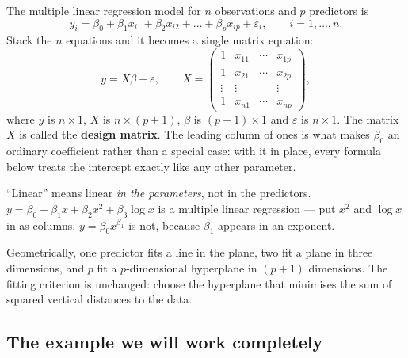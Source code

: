 \documentclass[11pt]{article}
\begin{document}
The multiple linear regression model for $n$ observations and $p$ predictors
is
\begin{equation}
  \label{eq:model}
  y_i = \beta_0 + \beta_1 x_{i1} + \beta_2 x_{i2} + \dots +
        \beta_p x_{ip} + \varepsilon_i,
  \qquad i = 1, \dots, n .
\end{equation}
Stack the $n$ equations and it becomes a single matrix equation:
\begin{equation}
  \label{eq:matrix}
  y = X\beta + \varepsilon,
  \qquad
  X = \begin{pmatrix}
    1 & x_{11} & \cdots & x_{1p}\\
    1 & x_{21} & \cdots & x_{2p}\\
    \vdots & \vdots & & \vdots\\
    1 & x_{n1} & \cdots & x_{np}
  \end{pmatrix},
\end{equation}
where $y$ is $n\times1$, $X$ is $n\times(p+1)$, $\beta$ is $(p+1)\times1$ and
$\varepsilon$ is $n\times1$. The matrix $X$ is called the \textbf{design
matrix}. The leading column of ones is what makes $\beta_0$ an ordinary
coefficient rather than a special case: with it in place, every formula below
treats the intercept exactly like any other parameter.

\begin{keyidea}
``Linear'' means linear \emph{in the parameters}, not in the predictors.
$y = \beta_0 + \beta_1 x + \beta_2 x^2 + \beta_3 \log x$ is a multiple linear
regression --- put $x^2$ and $\log x$ in as columns. $y = \beta_0 x^{\beta_1}$
is not, because $\beta_1$ appears in an exponent.
\end{keyidea}

Geometrically, one predictor fits a line in the plane, two fit a plane in
three dimensions, and $p$ fit a $p$-dimensional hyperplane in $(p+1)$
dimensions. The fitting criterion is unchanged: choose the hyperplane that
minimises the sum of squared vertical distances to the data.

\subsection{The example we will work completely}
\label{sec:flats}
\end{document}
